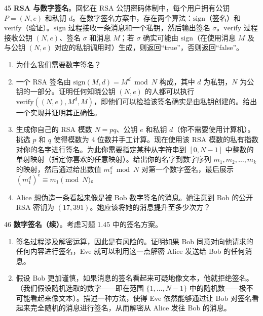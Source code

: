 \begin{exercise}{45}
\textbf{RSA 与数字签名}。回忆在 RSA 公钥密码体制中，每个用户拥有公钥 $P = (N, e)$ 和私钥 $d$。在数字签名方案中，存在两个算法：$\mathrm{sign}$（签名）和 $\mathrm{verify}$（验证）。$\mathrm{sign}$ 过程接收一条消息和一个私钥，然后输出签名 $\sigma$。$\mathrm{verify}$ 过程接收公钥 $(N, e)$、签名 $\sigma$ 和消息 $M$；若 $\sigma$ 确实可能由 $\mathrm{sign}$（在使用消息 $M$ 及与公钥 $(N, e)$ 对应的私钥调用时）生成，则返回“true”，否则返回“false”。
\begin{enumerate}
    \item[(a)] 为什么我们需要数字签名？
    \item[(b)] 一个 RSA 签名由 $\mathrm{sign}(M, d) = M^d \bmod N$ 构成，其中 $d$ 为私钥，$N$ 为公钥的一部分。证明任何知晓公钥 $(N, e)$ 的人都可以执行 $\mathrm{verify}((N, e), M^d, M)$，即他们可以检验该签名确实是由私钥创建的。给出一个实现并证明其正确性。
    \item[(c)] 生成你自己的 RSA 模数 $N = pq$、公钥 $e$ 和私钥 $d$（你不需要使用计算机）。挑选 $p$ 和 $q$ 使得模数为 4 位数并手工计算。现在使用该 RSA 模数的私有指数对你的名字进行签名。为此你需要指定某种从字符串到 $[0, N-1]$ 中整数的单射映射（指定你喜欢的任意映射）。给出你的名字到数字序列 $m_1, m_2, \dots, m_k$ 的映射，然后通过给出数值 $m_1^d \bmod N$ 对第一个数字签名，最后展示 $(m_1^d)^e \equiv m_1 \pmod N$。
    \item[(d)] Alice 想伪造一条看起来像是被 Bob 数字签名的消息。她注意到 Bob 的公开 RSA 密钥为 $(17, 391)$。她应该将她的消息提升至多少次方？
\end{enumerate}
\end{exercise}

\begin{exercise}{46}
\textbf{数字签名（续）}。考虑习题 1.45 中的签名方案。
\begin{enumerate}
    \item[(a)] 签名过程涉及解密运算，因此是有风险的。证明如果 Bob 同意对向他请求的任何内容进行签名，Eve 就可以利用这一点解密 Alice 发送给 Bob 的任何消息。
    \item[(b)] 假设 Bob 更加谨慎，如果消息的签名看起来可疑地像文本，他就拒绝签名。（我们假设随机选取的数字——即在范围 $\{1, \dots, N-1\}$ 中的随机数——极不可能看起来像文本）。描述一种方法，使得 Eve 依然能够通过让 Bob 对签名看起来完全随机的消息进行签名，从而解密从 Alice 发往 Bob 的消息。
\end{enumerate}
\end{exercise}
